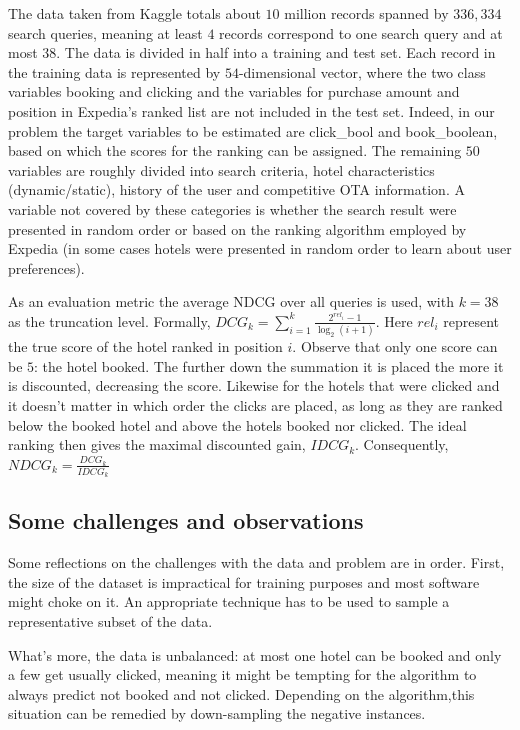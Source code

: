 \documentclass{llncs}
\begin{document}
The data taken from Kaggle totals about $10$ million records spanned by $336,334$ search queries, meaning at least $4$ records correspond to one search query and at most $38$. The data is divided in half into a training and test set. Each record in the training data is represented by $54$-dimensional vector, where the two class variables booking and clicking and the variables for purchase amount and position in Expedia's ranked list are not included in the test set. Indeed, in our problem the target variables to be estimated are click\_bool and book\_boolean, based on which the scores for the ranking can be assigned. The remaining $50$ variables are roughly divided into search criteria, hotel characteristics (dynamic/static), history of the user and competitive OTA information. A variable not covered by these categories is whether the search result were presented in random order or based on the ranking algorithm employed by Expedia (in some cases hotels were presented in random order to learn about user preferences).

As an evaluation metric the average NDCG over all queries is used, with $k=38$ as the truncation level. Formally, $\displaystyle DCG_{k}=\sum_{i=1}^{k}\frac{2^{rel_i}-1}{\log_{2}(i+1)}$. Here $rel_{i}$ represent the true score of the hotel ranked in position $i$. Observe that only one score can be $5$: the hotel booked. The further down the summation it is placed the more it is discounted, decreasing the score. Likewise for the hotels that were clicked and it doesn't matter in which order the clicks are placed, as long as they are ranked below the booked hotel and above the hotels booked nor clicked. The ideal ranking then gives the maximal discounted gain, $IDCG_{k}$. Consequently, $NDCG_{k}=\frac{DCG_{k}}{IDCG_{k}}$ 

\subsection{Some challenges and observations}
Some reflections on the challenges with the data and problem are in order. First, the size of the dataset is impractical for training purposes and most software might choke on it. An appropriate technique has to be used to sample a representative subset of the data.

What's more, the data is unbalanced: at most one hotel can be booked and only a few get usually clicked, meaning it might be tempting for the algorithm to always predict not booked and not clicked. Depending on the algorithm,this situation can be remedied by down-sampling the negative instances.
\end{document}
